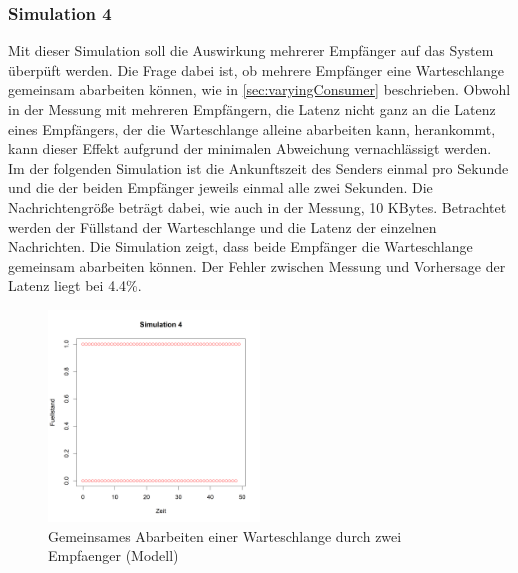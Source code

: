 \subsubsection{Simulation 4}
Mit dieser Simulation soll die Auswirkung mehrerer Empfänger auf das System überpüft werden. Die Frage dabei ist, ob mehrere Empfänger eine Warteschlange gemeinsam abarbeiten können, wie in \autoref{sec:varyingConsumer} beschrieben. Obwohl in der Messung mit mehreren Empfängern, die Latenz nicht ganz an die Latenz eines Empfängers, der die Warteschlange alleine abarbeiten kann, herankommt, kann dieser Effekt aufgrund der minimalen Abweichung vernachlässigt werden. Im der folgenden Simulation ist die Ankunftszeit des Senders einmal pro Sekunde und die der beiden Empfänger jeweils einmal alle zwei Sekunden. Die Nachrichtengröße beträgt dabei, wie auch in der Messung, 10 KBytes. Betrachtet werden der Füllstand der Warteschlange und die Latenz der einzelnen Nachrichten. 
Die Simulation zeigt, dass beide Empfänger die Warteschlange gemeinsam abarbeiten können. Der Fehler zwischen Messung und Vorhersage der Latenz liegt bei 4.4\%. 

\begin{figure}
\center
  \includegraphics[width=0.5\textwidth]{images/modelSimulationResults/simulation4.png}
  \caption{Gemeinsames Abarbeiten einer Warteschlange durch zwei Empfaenger (Modell)}
  \label{img:simulation4}
\end{figure}




